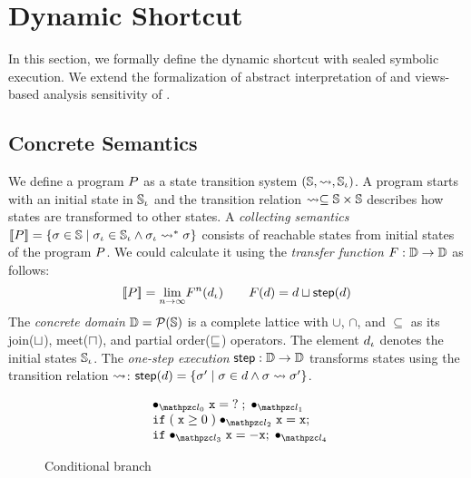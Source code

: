 \section{Dynamic Shortcut}\label{sec:formal}

In this section, we formally define the dynamic shortcut with sealed symbolic
execution.  We extend the formalization of abstract interpretation of
\citet{abs-interp-1977, abs-interp-1992} and views-based analysis sensitivity of
\citet{sens-toplas}.


\subsection{Concrete Semantics}

We define a program $P$ as a state transition system $(\mathbb{S}, \leadsto,
\mathbb{S}_\iota)$.  A program starts with an initial state in $\mathbb{S}_\iota$ and the
transition relation $\leadsto \subseteq \mathbb{S} \times \mathbb{S}$ describes how states
are transformed to other states.  A \textit{collecting semantics} $[\![{P}]\!] =
\{ \sigma \in \mathbb{S} \mid \sigma_\iota \in \mathbb{S}_\iota \wedge \sigma_\iota \leadsto^* \sigma \}$ consists of
reachable states from initial states of the program $P$.  We could calculate
it using the \textit{transfer function} $F: \mathbb{D} \rightarrow \mathbb{D}$ as
follows:
\[
  [\![{P}]\!] = \underset{n \rightarrow \infty}{\lim}{F^n(d_\iota)}\\
  \qquad
  F(d) = d \sqcup \textsf{step}(d)\\
\]
The \textit{concrete domain} $\mathbb{D} = \mathcal{P}(\mathbb{S})$ is a complete lattice
with $\cup$, $\cap$, and $\subseteq$ as its join($\sqcup$), meet($\sqcap$), and
partial order($\sqsubseteq$) operators.  The element $d_\iota$ denotes the initial
states $\mathbb{S}_\iota$.  The \textit{one-step execution} $\textsf{step}: \mathbb{D} \rightarrow
\mathbb{D}$ transforms states using the transition relation $\leadsto$: $\textsf{step}(d) =
\{ \sigma' \mid \sigma \in d \wedge \sigma \leadsto \sigma' \}$.

\begin{figure}[H]
  \[
    \begin{array}{l}
      \enspace \labdot{0} \; \varx = \;? \; ;  \; \labdot{1}\\
      \enspace \kwif \; (\; \varx \geq 0 \;) \; \labdot{2} \; \varx = \varx ;\\
      \enspace \kwelse \; \labdot{3} \; \varx = -\varx ;  \; \labdot{4}\\
    \end{array}
  \]
  \vspace*{-1em}
  \caption{Conditional branch}
  \label{fig:running-example}
\end{figure}

